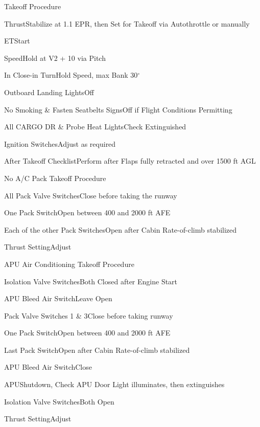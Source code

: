 \documentclass[sim-use, blue_items]{checklist}
\begin{document}
\begin{checklist}{Takeoff Procedure} %
	\item{Thrust}{Stabilize at 1.1 EPR, then Set for Takeoff via Autothrottle or manually}
	\item{ET}{Start}
	\item{Speed}{Hold at V2 + 10 via Pitch}
	\item{In Close-in Turn}{Hold Speed, max Bank 30$^\circ$}
	\item{Outboard Landing Lights}{Off}
	\item{No Smoking \& Fasten Seatbelts Signs}{Off if Flight Conditions Permitting}
	\item{All CARGO DR \& Probe Heat Lights}{Check Extinguished}
	\item{Ignition Switches}{Adjust as required}
	\item{After Takeoff Checklist}{Perform after Flaps fully retracted and over 1500 ft AGL}
\end{checklist}

\begin{checklist}{No A/C Pack Takeoff Procedure}
	\item{All Pack Valve Switches}{Close before taking the runway}
	\item{One Pack Switch}{Open between 400 and 2000 ft AFE}
	\item{Each of the other Pack Switches}{Open after Cabin Rate-of-climb stabilized}
	\item{Thrust Setting}{Adjust}
\end{checklist}

\begin{checklist}{APU Air Conditioning Takeoff Procedure}
	\item{Isolation Valve Switches}{Both Closed after Engine Start}
	\item{APU Bleed Air Switch}{Leave Open}
	\item{Pack Valve Switches 1 \& 3}{Close before taking runway}
	\item{One Pack Switch}{Open between 400 and 2000 ft AFE}
	\item{Last Pack Switch}{Open after Cabin Rate-of-climb stabilized}
	\item{APU Bleed Air Switch}{Close}
	\item{APU}{Shutdown, Check APU Door Light illuminates, then extinguishes}
	\item{Isolation Valve Switches}{Both Open}
	\item{Thrust Setting}{Adjust}
\end{checklist}
\end{document}
